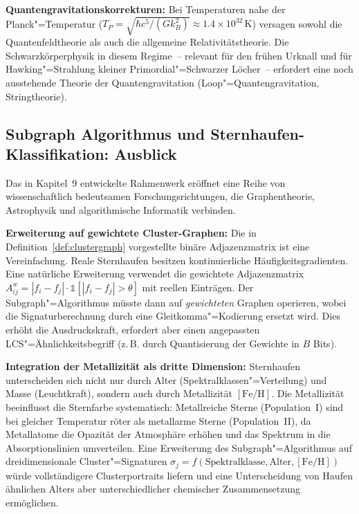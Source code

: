 ﻿\documentclass[a4paper,12pt]{article}
\theoremstyle{definition}
\begin{document}
\textbf{Quantengravitationskorrekturen:} Bei Temperaturen nahe der
Planck"=Temperatur ($T_P = \sqrt{\hbar c^5 / (G k_B^2)} \approx 1.4 \times 10^{32}\,\text{K}$)
versagen sowohl die Quantenfeldtheorie als auch die allgemeine
Relativitätstheorie. Die Schwarzkörperphysik in diesem Regime~--
relevant für den frühen Urknall und für Hawking"=Strahlung kleiner
Primordial"=Schwarzer Löcher~-- erfordert eine noch ausstehende Theorie
der Quantengravitation (Loop"=Quantengravitation, Stringtheorie).

\subsection{Subgraph Algorithmus und Sternhaufen-Klassifikation: Ausblick}

Das in Kapitel~9 entwickelte Rahmenwerk eröffnet eine Reihe von
wissenschaftlich bedeutsamen Forschungsrichtungen, die Graphentheorie,
Astrophysik und algorithmische Informatik verbinden.

\textbf{Erweiterung auf gewichtete Cluster-Graphen:}
Die in Definition~\ref{def:clustergraph} vorgestellte binäre
Adjazenzmatrix ist eine Vereinfachung. Reale Sternhaufen besitzen
kontinuierliche Häufigkeitsgradienten. Eine natürliche Erweiterung
verwendet die gewichtete Adjazenzmatrix
$A^w_{ij} = |f_i - f_j| \cdot \mathbb{1}[|f_i - f_j| > \theta]$
mit reellen Einträgen. Der Subgraph"=Algorithmus müsste dann auf
\emph{gewichteten} Graphen operieren, wobei die Signaturberechnung
durch eine Gleitkomma"=Kodierung ersetzt wird. Dies erhöht die
Ausdruckskraft, erfordert aber einen angepassten LCS"=Ähnlichkeitsbegriff
(z.\,B. durch Quantisierung der Gewichte in $B$ Bits).

\textbf{Integration der Metallizität als dritte Dimension:}
Sternhaufen unterscheiden sich nicht nur durch Alter (Spektralklassen"=Verteilung)
und Masse (Leuchtkraft), sondern auch durch Metallizität $[\text{Fe/H}]$.
Die Metallizität beeinflusst die Sternfarbe systematisch:
Metallreiche Sterne (Population~I) sind bei gleicher Temperatur
röter als metallarme Sterne (Population~II), da Metallatome die
Opazität der Atmosphäre erhöhen und das Spektrum in die Absorptionslinien
umverteilen. Eine Erweiterung des Subgraph"=Algorithmus auf
dreidimensionale Cluster"=Signaturen $\sigma_j = f(\text{Spektralklasse}, \text{Alter}, [\text{Fe/H}])$
würde vollständigere Clusterportraits liefern und eine Unterscheidung
von Haufen ähnlichen Alters aber unterschiedlicher chemischer Zusammensetzung
ermöglichen.
\end{document}
